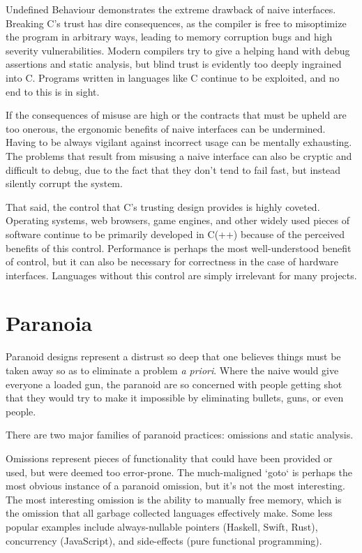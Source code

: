 Undefined Behaviour demonstrates the extreme drawback of naive
interfaces. Breaking C's trust has dire consequences, as the compiler is free to misoptimize the
program in arbitrary ways, leading to memory corruption bugs and high severity
vulnerabilities. Modern compilers try to give
a helping hand with debug assertions and static analysis, but blind trust is
evidently too deeply ingrained into C. Programs written in languages like C
continue to be exploited, and no end to this is in sight.

If the consequences of misuse are high or the contracts that must be upheld are
too onerous, the ergonomic benefits of naive interfaces can be undermined.
Having to be always vigilant against incorrect usage can be mentally exhausting.
The problems that result from misusing a naive interface can also be cryptic and
difficult to debug, due to the fact that they don't tend to fail fast, but instead
silently corrupt the system.

That said, the control that C's trusting design provides is highly coveted.
Operating systems, web browsers, game engines, and other widely used pieces of
software continue to be primarily developed in C(++) because of the perceived
benefits of this control. Performance is perhaps the most well-understood benefit
of control, but it can also be necessary for correctness in the case of hardware
interfaces. Languages without this control are simply irrelevant for many projects.





\section{Paranoia}

Paranoid designs represent a distrust so deep that one believes things must be
taken away so as to eliminate a problem \emph{a priori}. Where the naive would give
everyone a loaded gun, the paranoid are so concerned with people getting shot
that they would try to make it impossible by eliminating bullets, guns, or even
people.

There are two major families of paranoid practices: omissions and static analysis.

Omissions represent pieces of functionality that could have been provided or
used, but were deemed too error-prone. The much-maligned `goto` is perhaps
the most obvious instance of a paranoid omission, but it's not the most
interesting. The most interesting omission is the ability to manually free memory,
which is the omission that all garbage collected languages effectively make.
Some less popular examples include always-nullable pointers (Haskell, Swift, Rust),
concurrency (JavaScript), and side-effects (pure functional programming).


